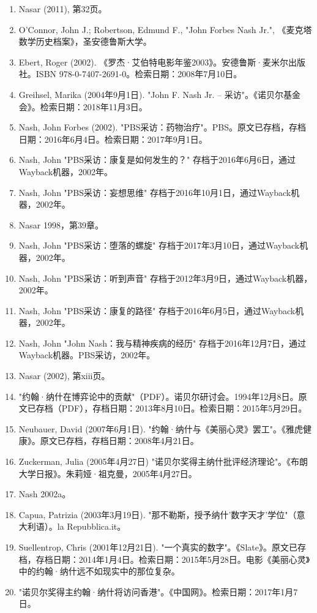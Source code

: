\begin{enumerate}
\item Nasar (2011), 第32页。
\item O'Connor, John J.; Robertson, Edmund F., "John Forbes Nash Jr.", 《麦克塔数学历史档案》，圣安德鲁斯大学。
\item Ebert, Roger (2002). 《罗杰·艾伯特电影年鉴2003》。安德鲁斯·麦米尔出版社。ISBN 978-0-7407-2691-0。检索日期：2008年7月10日。
\item Greihsel, Marika (2004年9月1日). "John F. Nash Jr. – 采访"。《诺贝尔基金会》。检索日期：2018年11月3日。
\item Nash, John Forbes (2002). "PBS采访：药物治疗"。PBS。原文已存档，存档日期：2016年6月4日。检索日期：2017年9月1日。
\item Nash, John "PBS采访：康复是如何发生的？" 存档于2016年6月6日，通过Wayback机器，2002年。
\item Nash, John "PBS采访：妄想思维" 存档于2016年10月1日，通过Wayback机器，2002年。
\item Nasar 1998，第39章。
\item Nash, John "PBS采访：堕落的螺旋" 存档于2017年3月10日，通过Wayback机器，2002年。
\item Nash, John "PBS采访：听到声音" 存档于2012年3月9日，通过Wayback机器，2002年。
\item Nash, John "PBS采访：康复的路径" 存档于2016年6月5日，通过Wayback机器，2002年。
\item Nash, John "John Nash：我与精神疾病的经历" 存档于2016年12月7日，通过Wayback机器。PBS采访，2002年。
\item Nasar (2002), 第xiii页。
\item "约翰·纳什在博弈论中的贡献"（PDF）。诺贝尔研讨会。1994年12月8日。原文已存档（PDF），存档日期：2013年8月10日。检索日期：2015年5月29日。
\item Neubauer, David (2007年6月1日). "约翰·纳什与《美丽心灵》罢工"。《雅虎健康》。原文已存档，存档日期：2008年4月21日。
\item Zuckerman, Julia (2005年4月27日) "诺贝尔奖得主纳什批评经济理论"。《布朗大学日报》。朱莉娅·祖克曼，2005年4月27日。
\item Nash 2002a。
\item Capua, Patrizia (2003年3月19日). "那不勒斯，授予纳什'数字天才'学位"（意大利语）。la Repubblica.it。
\item Suellentrop, Chris (2001年12月21日). "一个真实的数字"。《Slate》。原文已存档，存档日期：2014年1月4日。检索日期：2015年5月28日。电影《美丽心灵》中的约翰·纳什远不如现实中的那位复杂。
\item "诺贝尔奖得主约翰·纳什将访问香港"。《中国网》。检索日期：2017年1月7日。

\end{enumerate}
